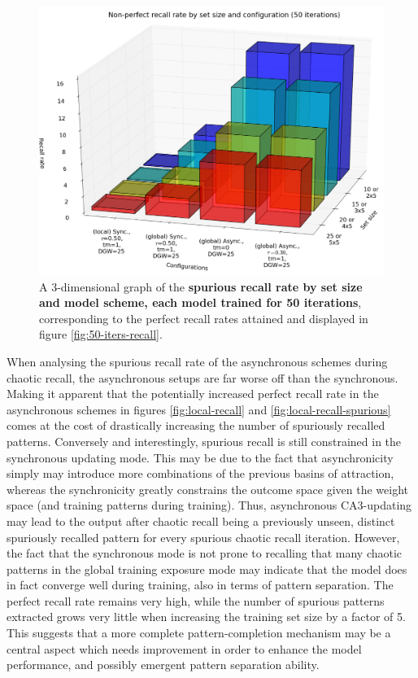 \begin{figure}
    \centering
    \includegraphics[width=13cm]{fig/i-iters/50-iters-recall-spurious}
    \caption{A 3-dimensional graph of the \textbf{spurious recall rate by set size and model scheme, each model trained for 50 iterations}, corresponding to the perfect recall rates attained and displayed in figure \ref{fig:50-iters-recall}.}
    \label{fig:50-iters-recall-spurious}
\end{figure}

When analysing the spurious recall rate of the asynchronous schemes during chaotic recall, the asynchronous setups are far worse off than the synchronous. Making it apparent that the potentially increased perfect recall rate in the asynchronous schemes in figures \ref{fig:local-recall} and \ref{fig:local-recall-spurious} comes at the cost of drastically increasing the number of spuriously recalled patterns. Conversely and interestingly, spurious recall is still constrained in the synchronous updating mode. This may be due to the fact that asynchronicity simply may introduce more combinations of the previous basins of attraction, whereas the synchronicity greatly constrains the outcome space given the weight space (and training patterns during training). Thus, asynchronous CA3-updating may lead to the output after chaotic recall being a previously unseen, distinct spuriously recalled pattern for every spurious chaotic recall iteration. However, the fact that the synchronous mode is not prone to recalling that many chaotic patterns in the global training exposure mode may indicate that the model does in fact converge well during training, also in terms of pattern separation. The perfect recall rate remains very high, while the number of spurious patterns extracted grows very little when increasing the training set size by a factor of 5. This suggests that a more complete pattern-completion mechanism may be a central aspect which needs improvement in order to enhance the model performance, and possibly emergent pattern separation ability.

